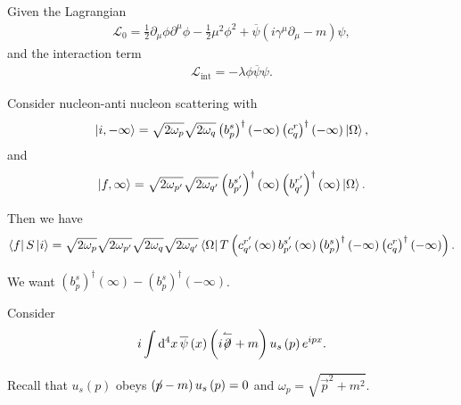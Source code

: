 Given the Lagrangian
\begin{align}
    \mathcal{L}_0 = \frac{1}{2} \partial_\mu \phi \partial^{\mu} \phi - \frac{1}{2} \mu^2 \phi^2 + \overline{\psi} \left( i \gamma^{\mu} \partial_\mu - m \right) \psi
,\end{align}
and the interaction term
\begin{align}
    \mathcal{L}_\text{int} = -\lambda \phi \overline{\psi}\psi
.\end{align}

Consider nucleon-anti nucleon scattering with
\begin{align}
    \ket{i, - \infty} = \sqrt{2\omega_p}  \sqrt{2\omega_q} \left( b_p^{s} \right)^{\dag} \left( -\infty \right) \left( c_q^{r} \right)^{\dag} \left( -\infty \right) \ket{\Omega}  
,\end{align}
and
\begin{align}
    \ket{f, \infty} = \sqrt{2\omega_{p'}} \sqrt{2\omega_{q'}} \left( b_{p'}^{s'} \right)^{\dag} \left( \infty \right)  \left( b_{q'}^{r'} \right)^{\dag} \left( \infty \right) \ket{\Omega}    
.\end{align}

Then we have
\begin{align}
    \bra{f} S \ket{i} = \sqrt{2\omega_p}  \sqrt{2\omega_{p'}} \sqrt{2\omega_{q}}  \sqrt{2 \omega_{q'}}  \bra{\Omega} T \left(  c^{r'}_{q'} \left( \infty \right)  b_{p'}^{s'}  \left( \infty \right) \left( b^{s}_p \right)^{\dag} \left( -\infty \right) \left( c_{q}^{r} \right)^{\dag} \left( -\infty \right)    \right) 
.\end{align}

We want $\left( b_p^{s} \right)^{\dag} \left( \infty \right) - \left( b_p^{s} \right)^{\dag} \left( -\infty \right) $.

Consider
\begin{align}
    i \int \dd{^{4}x} \overline{\psi}\left( x \right) \left( i \overset{\leftharpoonup}{\fbs{\partial}} + m \right) u_s \left( p \right) e^{ipx}
.\end{align}

Recall that $u_s \left( p \right) $ obeys $\left( \fbs{p} - m \right) u_s \left( p \right) = 0$ and $\omega_p = \sqrt{\vec{p}^2 + m^2}$.

